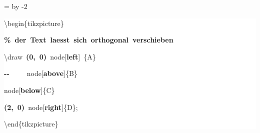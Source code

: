 \begingroup
\ttfamily
{}
=\textwidth
\advance{} by -2\fboxsep
\noindent
\colorbox{background}
{%
\parbox{\dimen255}
{%
\rule[-0.5ex]{0pt}{2.5ex}\hspace*{0.0em}\textbackslash{}begin\{tikzpicture\}\\
\rule[-0.5ex]{0pt}{2.5ex}\hspace*{1.0em}\textcolor{G}{\textbf{\%~der~Text~laesst~sich~orthogonal~verschieben}}\\
\rule[-0.5ex]{0pt}{2.5ex}\hspace*{1.0em}\textbackslash{}draw~\textcolor{B}{\textbf{(0,~0)}}~node[\textcolor{R}{\textbf{left}}]~\{A\}\\
\rule[-0.5ex]{0pt}{2.5ex}\hspace*{4.0em}\textcolor{B}{\textbf{{-}{-}}}~~~~~node[\textcolor{R}{\textbf{above}}]\{B\}\\
\rule[-0.5ex]{0pt}{2.5ex}\hspace*{7.5em}node[\textcolor{R}{\textbf{below}}]\{C\}\\
\rule[-0.5ex]{0pt}{2.5ex}\hspace*{4.0em}\textcolor{B}{\textbf{(2,~0)}}~node[\textcolor{R}{\textbf{right}}]\{D\};\\
\rule[-0.5ex]{0pt}{2.5ex}\hspace*{0.0em}\textbackslash{}end\{tikzpicture\}}%
}%
\endgroup

